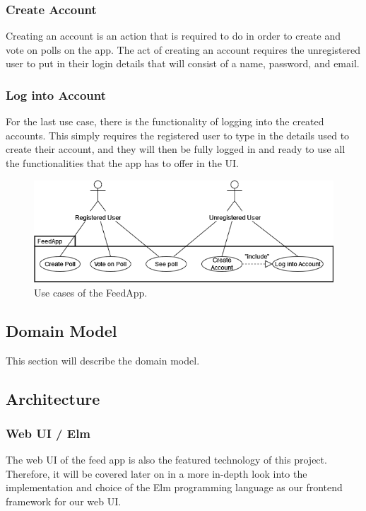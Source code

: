 \subsubsection{Create Account}
Creating an account is an action that is required to do in order to create and vote on polls on the app. The act of creating an account requires the unregistered user to put in their login details that will consist of a name, password, and email.

\subsubsection{Log into Account}
For the last use case, there is the functionality of logging into the created accounts. This simply requires the registered user to type in the details used to create their account, and they will then be fully logged in and ready to use all the functionalities that the app has to offer in the UI.

\begin{figure}[thb]
	\centering
	\includegraphics[scale=0.5]{figs/usecases.png}
	\caption{Use cases of the FeedApp.}
	\label{fig:usecases}
\end{figure}

\subsection{Domain Model}
This section will describe the domain model.

\subsection{Architecture}
\subsubsection{Web UI / Elm}
The web UI of the feed app is also the featured technology of this project. Therefore, it will be covered later on in a more in-depth look into the implementation and choice of the Elm programming language as our frontend framework for our web UI.

